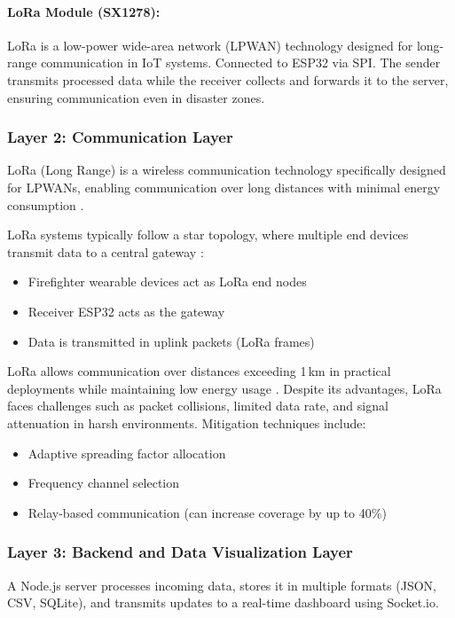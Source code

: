 \documentclass[12pt,a4paper]{article}
\begin{document}
	\paragraph{LoRa Module (SX1278):}
	LoRa is a low-power wide-area network (LPWAN) technology designed for long-range communication in IoT systems. Connected to ESP32 via SPI. The sender transmits processed data while the receiver collects and forwards it to the server, ensuring communication even in disaster zones.
	
	\subsubsection{Layer 2: Communication Layer}
	LoRa (Long Range) is a wireless communication technology specifically designed for LPWANs, enabling communication over long distances with minimal energy consumption \cite{haif2024}.
	
	LoRa systems typically follow a star topology, where multiple end devices transmit data to a central gateway \cite{sole2022}:
	\begin{itemize}
		\item Firefighter wearable devices act as LoRa end nodes
		\item Receiver ESP32 acts as the gateway
		\item Data is transmitted in uplink packets (LoRa frames)
	\end{itemize}
	
	LoRa allows communication over distances exceeding 1\,km in practical deployments while maintaining low energy usage \cite{obrien2025}. Despite its advantages, LoRa faces challenges such as packet collisions, limited data rate, and signal attenuation in harsh environments. Mitigation techniques include:
	\begin{itemize}
		\item Adaptive spreading factor allocation
		\item Frequency channel selection
		\item Relay-based communication (can increase coverage by up to 40\%)
	\end{itemize}
	
	\subsubsection{Layer 3: Backend and Data Visualization Layer}
	A Node.js server processes incoming data, stores it in multiple formats (JSON, CSV, SQLite), and transmits updates to a real-time dashboard using Socket.io.
	
\end{document}
